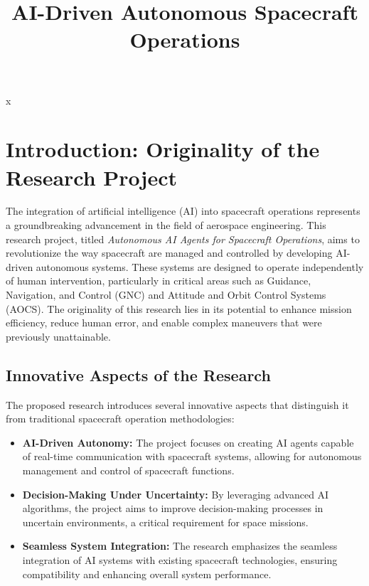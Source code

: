 \documentclass[a4paper,12pt]{article}
\title{AI-Driven Autonomous Spacecraft Operations}
\author{}
\date{}
\begin{document}
\maketitle
\tableofcontents
\newpage

x
\section{Introduction: Originality of the Research Project}

The integration of artificial intelligence (AI) into spacecraft operations represents a groundbreaking advancement in the field of aerospace engineering. This research project, titled \textit{Autonomous AI Agents for Spacecraft Operations}, aims to revolutionize the way spacecraft are managed and controlled by developing AI-driven autonomous systems. These systems are designed to operate independently of human intervention, particularly in critical areas such as Guidance, Navigation, and Control (GNC) and Attitude and Orbit Control Systems (AOCS). The originality of this research lies in its potential to enhance mission efficiency, reduce human error, and enable complex maneuvers that were previously unattainable.

\subsection{Innovative Aspects of the Research}

The proposed research introduces several innovative aspects that distinguish it from traditional spacecraft operation methodologies:

\begin{itemize}
    \item \textbf{AI-Driven Autonomy:} The project focuses on creating AI agents capable of real-time communication with spacecraft systems, allowing for autonomous management and control of spacecraft functions.
    \item \textbf{Decision-Making Under Uncertainty:} By leveraging advanced AI algorithms, the project aims to improve decision-making processes in uncertain environments, a critical requirement for space missions.
    \item \textbf{Seamless System Integration:} The research emphasizes the seamless integration of AI systems with existing spacecraft technologies, ensuring compatibility and enhancing overall system performance.
\end{itemize}
\end{document}
